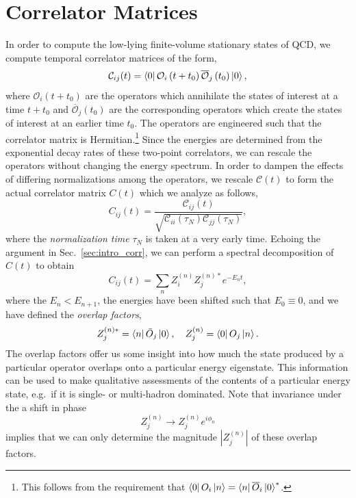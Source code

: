 \section{Correlator Matrices}\label{sec:correlator_matrices}
In order to compute the low-lying finite-volume stationary states of QCD, we compute temporal correlator matrices of the form,
\begin{equation}
    \mathcal{C}_{i j}(t)=\bra 0 \mathcal O_{i}\left(t+t_{0}\right) \overline{\mathcal O}_{j}\left(t_{0}\right)\ket 0,
\end{equation}
where $\mathcal O_i(t+t_0)$ are the operators which annihilate the states of interest at a time $t+t_0$ and $\overline{\mathcal O}_j(t_0)$ are the corresponding operators which create the states of interest at an earlier time $t_0$. The operators are engineered such that the correlator matrix is Hermitian.\footnote{This follows from the requirement that $\bra 0 O_i \ket n = \bra n \overline O_i \ket 0 ^*$.} Since the energies are determined from the exponential decay rates of these two-point correlators, we can rescale the operators without changing the energy spectrum. In order to dampen the effects of differing normalizations among the operators, we rescale $\mathcal C(t)$ to form the actual correlator matrix $C(t)$ which we analyze as follows,
\begin{equation}
    C_{ij}(t) = \frac{\mathcal C_{ij}(t)}{\sqrt{\mathcal C_{ii}(\tau_N) \mathcal C_{jj}(\tau_N)}},
\end{equation}
where the \emph{normalization time} $\tau_N$ is taken at a very early time. Echoing the argument in Sec.~\ref{sec:intro_corr}, we can perform a spectral decomposition of $C(t)$ to obtain
\begin{equation}\label{eq:corr_spec_decomp}
    C_{i j}(t)=\sum_{n} Z_{i}^{(n)} Z_{j}^{(n) *} e^{-E_{n} t},
\end{equation}
where the $E_n < E_{n+1}$, the energies have been shifted such that $E_0\equiv 0$, and we have defined the \emph{overlap factors},
\begin{equation}
    Z_{j}^{(n) *}=\bra n \bar{O}_{j}\ket 0, \quad Z_{j}^{(n)}=\bra 0 O_{j} \ket n.
\end{equation}
The overlap factors offer us some insight into how much the state produced by a particular operator overlaps onto a particular energy eigenstate. This information can be used to make qualitative assessments of the contents of a particular energy state, e.g.\ if it is single- or multi-hadron dominated. Note that invariance under the a shift in phase
\begin{equation}
    Z_{j}^{(n)} \rightarrow Z_{j}^{(n)} e^{i \phi_{n}}
\end{equation}
implies that we can only determine the magnitude $|Z_j^{(n)}|$ of these overlap factors.
